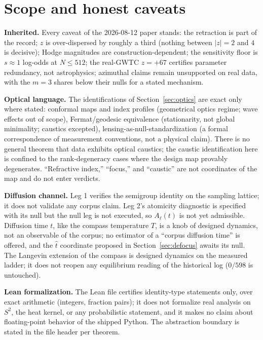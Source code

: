 \documentclass[11pt,a4paper]{article}
\theoremstyle{plain}
\theoremstyle{remark}
\begin{document}
\section{Scope and honest caveats}
\label{sec:scope}

\textbf{Inherited.} Every caveat of the 2026-08-12 paper stands: the retraction is part of the record; $z$ is over-dispersed by roughly a third (nothing between $|z|=2$ and $4$ is decisive); Hodge magnitudes are construction-dependent; the sensitivity floor is $s\approx1$ log-odds at $N\le512$; the real-GWTC $z=+67$ certifies parameter redundancy, not astrophysics; azimuthal claims remain unsupported on real data, with the $m{=}3$ shares below their nulls for a stated mechanism.

\textbf{Optical language.} The identifications of Section~\ref{sec:optics} are exact only where stated: conformal maps and index profiles (geometrical optics regime; wave effects out of scope), Fermat/geodesic equivalence (stationarity, not global minimality; caustics excepted), lensing-as-null-standardization (a formal correspondence of measurement conventions, not a physical claim). There is no general theorem that data exhibits optical caustics; the caustic identification here is confined to the rank-degeneracy cases where the design map provably degenerates. ``Refractive index,'' ``focus,'' and ``caustic'' are not coordinates of the map and do not enter verdicts.

\textbf{Diffusion channel.} Leg 1 verifies the semigroup identity on the sampling lattice; it does not validate any corpus claim. Leg 2's atomicity diagnostic is specified with its null but the null leg is not executed, so $A_\ell(t)$ is not yet admissible. Diffusion time $t$, like the compass temperature $T$, is a knob of designed dynamics, not an observable of the corpus; no estimator of a ``corpus diffusion time'' is offered, and the $\hat t$ coordinate proposed in Section~\ref{sec:defocus} awaits its null. The Langevin extension of the compass is designed dynamics on the measured ladder; it does not reopen any equilibrium reading of the historical log ($0/598$ is untouched).

\textbf{Lean formalization.} The Lean file certifies identity-type statements only, over exact arithmetic (integers, fraction pairs); it does not formalize real analysis on $S^2$, the heat kernel, or any probabilistic statement, and it makes no claim about floating-point behavior of the shipped Python. The abstraction boundary is stated in the file header per theorem.
\end{document}
